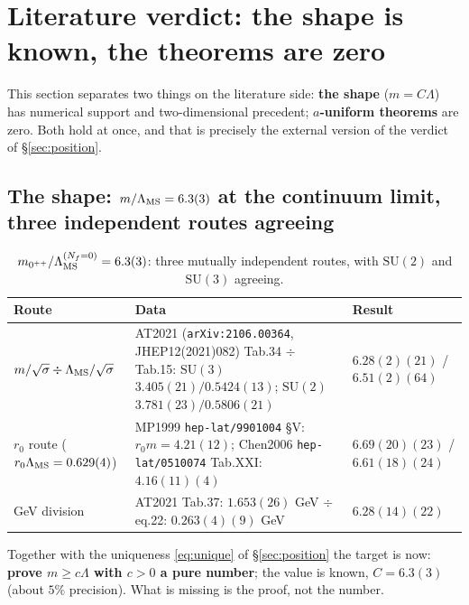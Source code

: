 \section{Literature verdict: the shape is known, the theorems are zero}
\label{sec:lit}

This section separates two things on the literature side: \textbf{the shape} ($m=C\Lambda$) has
numerical support and two-dimensional precedent; \textbf{$a$-uniform theorems} are zero. Both hold at
once, and that is precisely the external version of the verdict of \S\ref{sec:position}.

\subsection{The shape: $m/\Lambda_{\mathrm{MS}}=6.3(3)$ at the continuum limit, three independent routes agreeing}

\begin{table}[h]
\centering\footnotesize
\setlength{\tabcolsep}{5pt}
\renewcommand{\arraystretch}{1.12}
\begin{tabularx}{\textwidth}{@{}l X l@{}}
\toprule
\textbf{Route} & \textbf{Data} & \textbf{Result}\\
\midrule
$m/\sqrt{\sigma}\div\Lambda_{\mathrm{MS}}/\sqrt{\sigma}$ & AT2021 (\texttt{arXiv:2106.00364}, JHEP12(2021)082) Tab.34 $\div$ Tab.15:
$\mathrm{SU}(3)$ $3.405(21)/0.5424(13)$; $\mathrm{SU}(2)$ $3.781(23)/0.5806(21)$ & $6.28(2)(21)$ / $6.51(2)(64)$\\
$r_0$ route ($r_0\Lambda_{\mathrm{MS}}=0.629(4)$) & MP1999 \texttt{hep-lat/9901004} \S V: $r_0m=4.21(12)$; Chen2006 \texttt{hep-lat/0510074}
Tab.XXI: $4.16(11)(4)$ & $6.69(20)(23)$ / $6.61(18)(24)$\\
GeV division & AT2021 Tab.37: $1.653(26)$ GeV $\div$ eq.22: $0.263(4)(9)$ GeV & $6.28(14)(22)$\\
\bottomrule
\end{tabularx}
\caption{$m_{0^{++}}/\Lambda_{\mathrm{MS}}^{(N_f=0)}=6.3(3)$: three mutually independent routes, with $\mathrm{SU}(2)$ and
$\mathrm{SU}(3)$ agreeing.}
\label{tab:c}
\end{table}

\noindent
Together with the uniqueness \eqref{eq:unique} of \S\ref{sec:position} the target is now: \textbf{prove
$m\ge c\Lambda$ with $c>0$ a pure number}; the value is known, $C=6.3(3)$ (about $5\%$ precision). What
is missing is the proof, not the number. \LE
{}

